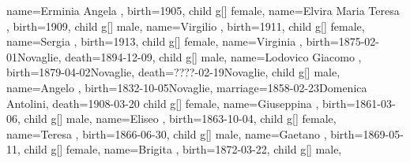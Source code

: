 \documentclass{article}
\begin{document}
\begin{midpage}
\begin{center}
\begin{genealogypicture}
{{{{{{                        name={Erminia Angela },
                        birth={1905}{},
                    }
                }
                child{
                    g[]{
                        female,
                        name={Elvira Maria Teresa },
                        birth={1909}{},
                    }
                }
                child{
                    g[]{
                        male,
                        name={Virgilio },
                        birth={1911}{},
                    }
                }
                child{
                    g[]{
                        female,
                        name={Sergia },
                        birth={1913}{},
                    }
                }
            }
            child{
                g[]{
                    female,
                    name={Virginia },
                    birth={1875-02-01}{Novaglie},
                    death={1894-12-09}{},
                }
            }
            child{
                g[]{
                    male,
                    name={Lodovico Giacomo },
                    birth={1879-04-02}{Novaglie},
                    death={????-02-19}{Novaglie},
                }
            }
        }
        child{
            g[]{
                male,
                name={Angelo },
                birth={1832-10-05}{Novaglie},
                marriage={1858-02-23}{Domenica Antolini},
                death={1908-03-20}{}
            }
            child{
                g[]{
                    female,
                    name={Giuseppina },
                    birth={1861-03-06}{},
                }
            }
            child{
                g[]{
                    male,
                    name={Eliseo },
                    birth={1863-10-04}{},
                }
            }
            child{
                g[]{
                    female,
                    name={Teresa },
                    birth={1866-06-30}{},
                }
            }
            child{
                g[]{
                    male,
                    name={Gaetano },
                    birth={1869-05-11}{},
                }
            }
            child{
                g[]{
                    female,
                    name={Brigita },
                    birth={1872-03-22}{},
                }
            }
            child{
                g[]{
                    male,
}}}}}
\end{genealogypicture}
\end{center}
\end{midpage}
\end{document}

